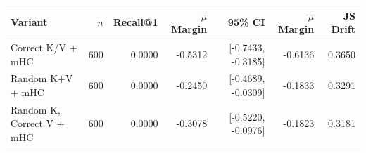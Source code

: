 \begin{tabular}{l r r r r r r}
\toprule
Variant & $n$ & Recall@1 & $\mu$ Margin & 95\% CI & $\tilde{\mu}$ Margin & JS Drift \\
\midrule
Correct K/V + mHC & 600 & 0.0000 & -0.5312 & [-0.7433, -0.3185] & -0.6136 & 0.3650 \\
Random K+V + mHC & 600 & 0.0000 & -0.2450 & [-0.4689, -0.0309] & -0.1833 & 0.3291 \\
Random K, Correct V + mHC & 600 & 0.0000 & -0.3078 & [-0.5220, -0.0976] & -0.1823 & 0.3181 \\
\bottomrule
\end{tabular}
